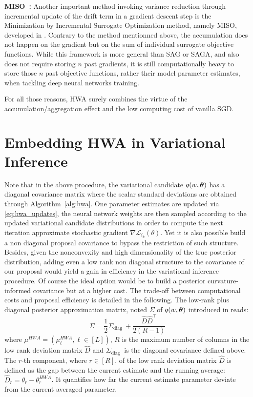 \documentclass[tablecaption=bottom,wcp]{jmlr} %
\begin{document}
\textbf{MISO~\citep{mairal2015incremental}:} Another important method invoking variance reduction through incremental update of the drift term in a gradient descent step is the Minimization by Incremental Surrogate Optimization method, namely MISO, developed in \citet{mairal2015incremental}.
Contrary to the method mentionned above, the accumulation does not happen on the gradient but on the sum of individual surrogate objective functions.
While this framework is more general than SAG or SAGA, and also does not require storing $n$ past gradients, it is still computationally heavy to store those $n$ past objective functions, rather their model parameter estimates, when tackling deep neural networks training.

For all those reasons, \textsc{HWA} surely combines the virtue of the accumulation/aggregation effect and the low computing cost of vanilla SGD.



\section{Embedding HWA in Variational Inference}
Note that in the above procedure, the variational candidate $q(w, \param)$ has a diagonal covariance matrix where the scalar standard deviations are obtained through Algorithm~\ref{alg:hwa}.
One parameter estimates are updated via \eqref{eq:hwa_updates}, the neural network weights are then sampled according to the updated variational candidate distributions in order to compute the next iteration approximate stochastic gradient $\nabla \mathcal{L}_{i_{k}}(\theta)$.
Yet it is also possible build a non diagonal proposal covariance to bypass the restriction of such structure.
Besides, given the nonconvexity and high dimensionality of the true posterior distribution, adding even a low rank non diagonal structure to the covariance of our proposal would yield a gain in efficiency in the variational inference procedure.
Of course the ideal option would be to build a posterior curvature-informed covariance but at a higher cost.
The trade-off between computational costs and proposal efficiency is detailed in the following.
The low-rank plus diagonal posterior approximation matrix, noted $\Sigma$ of $q(w, \param)$ introduced in \citep{maddox2019simple} reads:
\begin{equation}
\Sigma = \frac{1}{2} \Sigma_{\text {diag }}+\frac{\widehat{D} \widehat{D}^{\top}}{2(R-1)}
\end{equation}
where $\mu^{HWA} = (\mu_{\ell}^{HWA}, \ell \in [L])$, $R$ is the maximum number of columns in the low rank deviation matrix $\widehat{D}$ and $\Sigma_{\text {diag }}$ is the diagonal covariance defined above. The $r$-th component, where $r \in [R]$, of the  low rank deviation matrix $\widehat{D}$ is defined as the gap between the current estimate and the running average: $\widehat{D}_r = \theta_r - \theta^{HWA}_r$. It quantifies how far the current estimate parameter deviate from the current averaged parameter.
\end{document}
